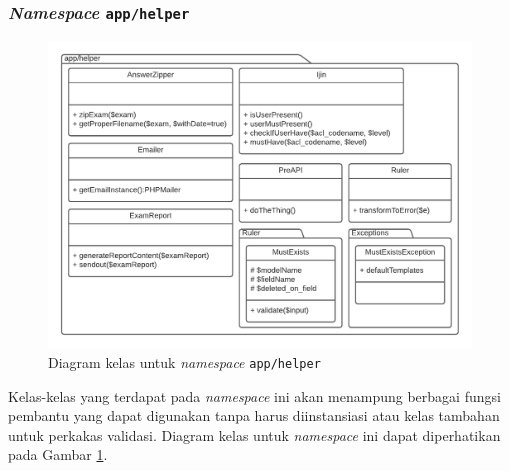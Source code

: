 \subsubsection{\textit{Namespace} \texttt{app/helper}}
    \begin{figure}
        \centering
        \includegraphics[width=0.75\paperwidth]{Gambar/classmap-be/Classmap - app-helper.pdf}
        \caption{Diagram kelas untuk \textit{namespace} \texttt{app/helper}}
        \label{fig:classmap_app-helper}
    \end{figure}
    Kelas-kelas yang terdapat pada \textit{namespace} ini akan menampung berbagai fungsi pembantu
    yang dapat digunakan tanpa harus diinstansiasi atau kelas tambahan untuk perkakas validasi.
    Diagram kelas untuk \textit{namespace} ini dapat diperhatikan pada Gambar 
    \ref{fig:classmap_app-helper}.
    

